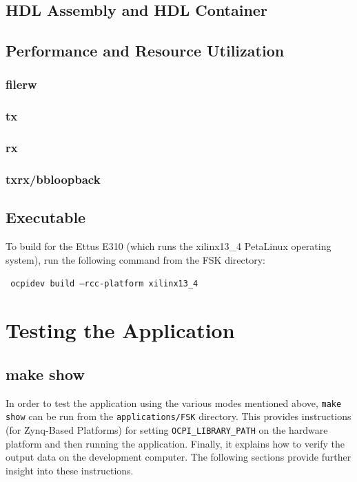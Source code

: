 	\newpage
\subsection{HDL Assembly and HDL Container}
\assetsdoc

\begin{landscape}
\subsection{Performance and Resource Utilization}
\subsubsection{filerw}
\assetsdoc
\subsubsection{tx}

\subsubsection{rx}

\subsubsection{txrx/bbloopback}

\end{landscape}
\subsection{Executable}
\noindent To build for the Ettus E310 (which runs the xilinx13\_4 PetaLinux operating system), run the following command from the FSK directory:\par\medskip 
\texttt{ ocpidev build --rcc-platform xilinx13\_4 }\par\medskip
\assetsdoc

\section{Testing the Application}
\assetsdoc
\subsection{make show}
In order to test the application using the various modes mentioned above, \texttt{make show} can be run from the \texttt{applications/FSK} directory. This provides instructions (for Zynq-Based Platforms) for setting \texttt{OCPI\_LIBRARY\_PATH} on the hardware platform and then running the application. Finally, it explains how to verify the output data on the development computer. The following sections provide further insight into these instructions.
